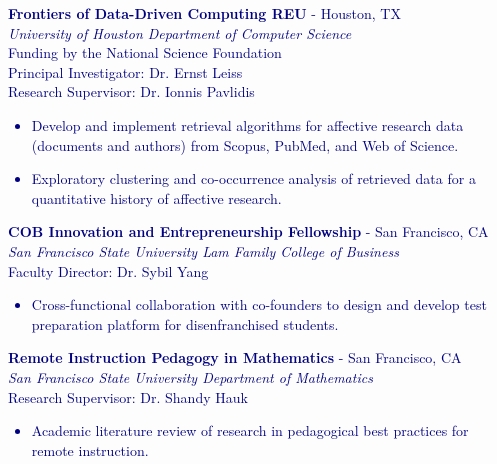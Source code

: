 \documentclass[hidelinks, 10pt]{article}
\newcommand{\bodyspacing}{1mm}
\begin{document}
\begin{textblock}{8.75}
    \textcolor{navy}{{\textbf{Frontiers of Data-Driven Computing REU} - Houston, TX}\\
        \emph{University of Houston Department of Computer Science}\\
        Funding by the National Science Foundation\\
        Principal Investigator: Dr. Ernst Leiss\\
        Research Supervisor: Dr. Ionnis Pavlidis
        \begin{itemize}[leftmargin=5mm]
            \setlength\itemsep{-0.25em}
            \item Develop and implement retrieval algorithms for affective research data (documents and authors) from Scopus, PubMed, and Web of Science.
            \item Exploratory clustering and co-occurrence analysis of
                  retrieved data for a quantitative history of affective research.
        \end{itemize}}

    \vspace{\bodyspacing}

    \textcolor{navy}{{\textbf{COB Innovation and Entrepreneurship Fellowship} - San Francisco, CA}\\
        \emph{San Francisco State University Lam Family College of Business}\\
        Faculty Director: Dr. Sybil Yang
        \begin{itemize}[leftmargin=5mm]
            \setlength\itemsep{-0.25em}
            \item Cross-functional collaboration with co-founders to design and develop test preparation platform for disenfranchised students.
        \end{itemize}}

    \vspace{2mm}


    \textcolor{navy}{{\textbf{Remote Instruction Pedagogy in Mathematics} - San Francisco, CA}\\
        \emph{San Francisco State University Department of Mathematics}\\
        Research Supervisor: Dr. Shandy Hauk
        \begin{itemize}[leftmargin=5mm]
            \setlength\itemsep{-0.25em}
            \item Academic literature review of research in pedagogical best practices for remote instruction.
        \end{itemize}}


\end{textblock}
\end{document}
